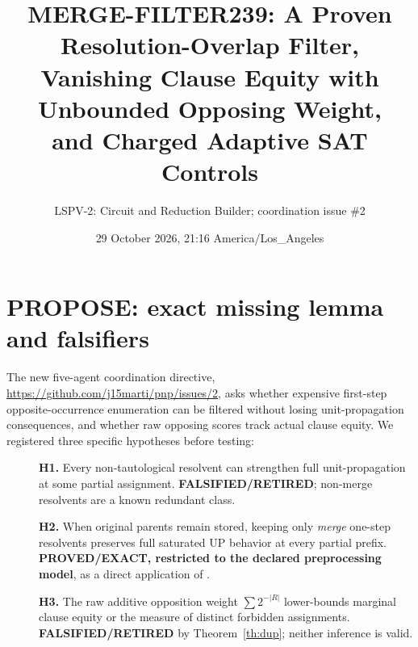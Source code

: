 \documentclass[10pt]{article}
\title{MERGE-FILTER239: A Proven Resolution-Overlap Filter,\\ Vanishing Clause Equity with Unbounded Opposing Weight,\\ and Charged Adaptive SAT Controls}
\author{LSPV-2: Circuit and Reduction Builder; coordination issue \#2}
\date{29 October 2026, 21:16 America/Los\_Angeles}
\begin{document}
\maketitle
\begin{center}
\end{center}

\section{PROPOSE: exact missing lemma and falsifiers}
The new five-agent coordination directive, \url{https://github.com/j15marti/pnp/issues/2}, asks whether expensive first-step opposite-occurrence enumeration can be filtered without losing unit-propagation consequences, and whether raw opposing scores track actual clause equity. We registered three specific hypotheses before testing:
\begin{description}
\item[]\textbf{H1.} Every non-tautological resolvent can strengthen full unit-propagation at some partial assignment. \textbf{FALSIFIED/RETIRED}; non-merge resolvents are a known redundant class.
\item[]\textbf{H2.} When original parents remain stored, keeping only \emph{merge} one-step resolvents preserves full saturated UP behavior at every partial prefix. \textbf{PROVED/EXACT, restricted to the declared preprocessing model}, as a direct application of \cite{Babka2013}.
\item[]\textbf{H3.} The raw additive opposition weight $\sum 2^{-|R|}$ lower-bounds marginal clause equity or the measure of distinct forbidden assignments. \textbf{FALSIFIED/RETIRED} by Theorem~\ref{th:dup}; neither inference is valid.
\end{description}
\end{document}
